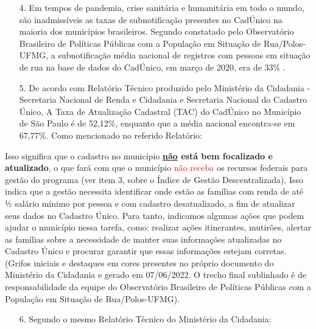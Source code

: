 \documentclass[14pt]{extarticle}
\begin{document}
\begin{enumerate}
 \item[4.] Em tempos de pandemia, crise sanitária e humanitária em todo o mundo, são inadmissíveis as taxas de subnotificação presentes no CadÚnico na maioria dos municípios brasileiros. Segundo constatado pelo Observatório Brasileiro de Políticas Públicas com a População em Situação de Rua/Polos-UFMG, a subnotificação média nacional de registros com pessoas em situação de rua na base de dados do CadÚnico, em março de 2020, era de 33\% \citep{dias}. 
  \item[5.] De acordo com Relatório Técnico produzido pelo Ministério da Cidadania - Secretaria Nacional de Renda e Cidadania e Secretaria Nacional do Cadastro Único, A Taxa de Atualização Cadastral (TAC) do CadÚnico no Município de São Paulo é de 52,12\%, enquanto que a média nacional encontra-se em 67,77\%. Como mencionado no referido Relatório: 
\end{enumerate}

\begin{trivlist}\leftskip=4cm
\item\small Isso significa que o cadastro no município \textbf{\underline{não} está bem focalizado e atualizado}, o que fará com que o município {\textcolor{red}{não receba}} os recursos federais para gestão do programa (ver item 3, sobre o Índice de Gestão Descentralizada). Isso indica que a gestão necessita identificar onde estão as famílias com renda de até ½ salário mínimo por pessoa e com cadastro desatualizado, a fim de atualizar seus dados no Cadastro Único. Para tanto, indicamos algumas ações que podem ajudar o município nessa tarefa, como: realizar ações itinerantes, mutirões, alertar as famílias sobre a necessidade de manter suas informações atualizadas no Cadastro Único e procurar garantir que essas informações estejam corretas. (Grifos iniciais e destaques em cores presentes no próprio documento do Ministério da Cidadania e gerado em 07/06/2022. O trecho final sublinhado é de responsabilidade da equipe do Observatório Brasileiro de Políticas Públicas com a População em Situação de Rua/Polos-UFMG).
\end{trivlist}

\begin{enumerate}
  \item[6.] Segundo o mesmo Relatório Técnico do Ministério da Cidadania:  
\end{enumerate}
\end{document}
